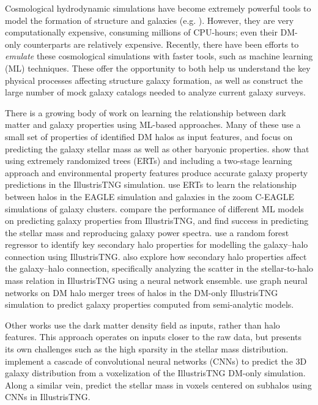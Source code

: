 Cosmological hydrodynamic simulations have become extremely powerful tools to model the formation of structure and galaxies (e.g. \citealt{springel_gadget_2001, genel_introducing_2014,dave_simba_2019}).
However, they are very computationally expensive, consuming millions of CPU-hours; even their DM-only counterparts are relatively expensive.
Recently, there have been efforts to \emph{emulate} these cosmological simulations with faster tools, such as machine learning (ML) techniques.
These offer the opportunity to both help us understand the key physical processes affecting structure galaxy formation, as well as construct the large number of mock galaxy catalogs needed to analyze current galaxy surveys. 

There is a growing body of work on learning the relationship between dark matter and galaxy properties using ML-based approaches.
Many of these use a small set of properties of identified DM halos as input features, and focus on predicting the galaxy stellar mass as well as other baryonic properties.
\cite{jo_machine-assisted_2019} show that using extremely randomized trees (ERTs) and including a two-stage learning approach and environmental property features produce accurate galaxy property predictions in the IllustrisTNG simulation.
\cite{lovell_machine_2021} use ERTs to learn the relationship between halos in the EAGLE simulation and galaxies in the zoom C-EAGLE simulations of galaxy clusters.
\cite{de_santi_mimicking_2021} compare the performance of different ML models on predicting galaxy properties from IllustrisTNG, and find success in predicting the stellar mass and reproducing galaxy power spectra.
\cite{delgado_modeling_2021} use a random forest regressor to identify key secondary halo properties for modelling the galaxy--halo connection using IllustrisTNG.
\cite{stiskalek_scatter_2022} also explore how secondary halo properties affect the galaxy--halo connection, specifically analyzing the scatter in the stellar-to-halo mass relation in IllustrisTNG using a neural network ensemble.   
\cite{jespersen_learning_2022} use graph neural networks on DM halo merger trees of halos in the DM-only IllustrisTNG simulation to predict galaxy properties computed from semi-analytic models.

Other works use the dark matter density field as inputs, rather than halo features.
This approach operates on inputs closer to the raw data, but presents its own challenges such as the high sparsity in the stellar mass distribution.
\cite{yip_dark_2019} implement a cascade of convolutional neural networks (CNNs) to predict the 3D galaxy distribution from a voxelization of the IllustrisTNG DM-only simulation.
Along a similar vein, \cite{kasmanoff_dm2gal_2020} predict the stellar mass in voxels centered on subhalos using CNNs in IllustrisTNG.

